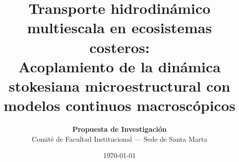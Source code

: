 \title{\textbf{Transporte hidrodinámico multiescala en ecosistemas costeros:\\ Acoplamiento de la dinámica stokesiana microestructural con modelos continuos macroscópicos}}
\author{\textbf{Propuesta de Investigación} \\ Comité de Facultad Institucional --- Sede de Santa Marta}
\date{\today}
